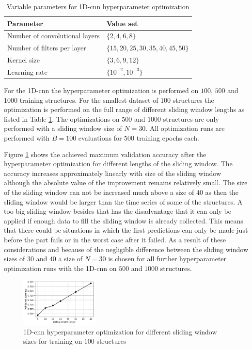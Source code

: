 \documentclass[conference]{IEEEtran}
\begin{document}
\begin{table}[htp]
	\centering
	\caption{Variable parameters for 1D-\gls{cnn} hyperparameter optimization}
	\label{tab:variable_parameters_cnn_optimization}
	\begin{tabular}{ll}
		\textbf{Parameter} & \textbf{Value set} \\
		\hline
		Number of convolutional layers & $ \{2, 4, 6, 8\} $ \\
		Number of filters per layer & $ \{15, 20, 25, 30, 35, 40, 45, 50\} $ \\
		Kernel size & $ \{3, 6, 9, 12\} $ \\
		Learning rate & $ \{10^{-2}, 10^{-3}\} $
	\end{tabular}
\end{table}

For the 1D-\gls{cnn} the hyperparameter optimization is performed on $ 100 $, $ 500 $ and $ 1000 $  training structures. For the smallest dataset of $ 100 $ structures the optimization is performed on the full range of different sliding window lengths as listed in Table \ref{tab:variable_parameters_cnn_optimization}. The optimizations on $ 500 $ and $ 1000 $ structures are only performed with a sliding window size of $ N = 30 $. All optimization runs are performed with $ B = 100 $ evaluations for $ 500 $ training epochs each.

Figure \ref{fig:influence_sequence_length_cnn} shows the achieved maximum validation accuracy after the hyperparameter optimization for different lengths of the sliding window. The accuracy increases approximately linearly with size of the sliding window although the absolute value of the improvement remains relatively small. The size of the sliding window can not be increased much above a size of $ 40 $ as then the sliding window would be larger than the time series of some of the structures. A too big sliding window besides that has the disadvantage that it can only be applied if enough data to fill the sliding window is already collected. This means that there could be situations in which the first predictions can only be made just before the part fails or in the worst case after it failed. As a result of these considerations and because of the negligible difference between the sliding window sizes of $ 30 $ and $ 40 $ a size of $ N = 30 $ is chosen for all further hyperparameter optimization runs with the 1D-\gls{cnn} on $ 500 $ and $ 1000 $ structures.

\begin{figure}[htp]
	\centering
	\includegraphics[width=0.35\textwidth]{python/influence_sequence_length_cnn.pdf}
	\caption{1D-\gls{cnn} hyperparameter optimization for different sliding window sizes for training on $ 100 $ structures}
	\label{fig:influence_sequence_length_cnn}
\end{figure}
\end{document}
